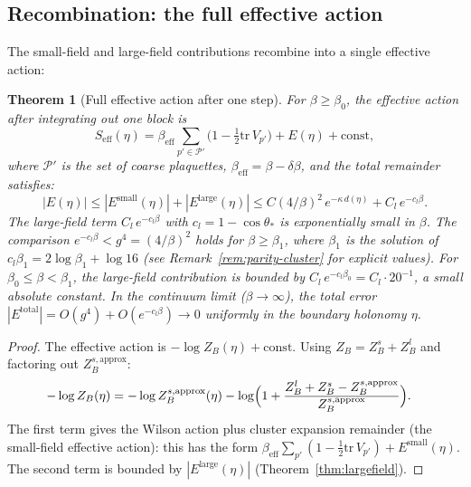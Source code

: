 \documentclass[11pt]{article}
\newtheorem{theorem}{Theorem}[section]
\theoremstyle{definition}
\newcommand{\tr}{\mathrm{tr}}
\begin{document}
\subsection{Recombination: the full effective action}
\label{subsec:recombine}

The small-field and large-field contributions recombine into a single
effective action:

\begin{theorem}[Full effective action after one step]\label{thm:fulleff}
For $\beta\ge\beta_0$, the effective action after integrating out one block
is
\begin{equation}\label{eq:Seff-full}
S_{\mathrm{eff}}(\eta)
=\beta_{\mathrm{eff}}\sum_{p'\in\mathcal{P}'}
\bigl(1-\tfrac{1}{2}\tr\,V_{p'}\bigr)
+E(\eta)+\mathrm{const},
\end{equation}
where $\mathcal{P}'$ is the set of coarse plaquettes,
$\beta_{\mathrm{eff}}=\beta-\delta\beta$, and the total remainder
satisfies:
\begin{equation}\label{eq:E-total}
|E(\eta)|\le|E^{\mathrm{small}}(\eta)|+|E^{\mathrm{large}}(\eta)|
\le C(4/\beta)^2\,e^{-\kappa\,d(\eta)}+C_l\,e^{-c_l\beta}.
\end{equation}
The large-field term $C_l\,e^{-c_l\beta}$ with
$c_l=1-\cos\theta_*$ is exponentially small in $\beta$.
The comparison $e^{-c_l\beta}<g^4=(4/\beta)^2$ holds for
$\beta\ge\beta_1$, where $\beta_1$ is the solution of
$c_l\beta_1=2\log\beta_1+\log 16$
(see Remark~\ref{rem:parity-cluster} for explicit values).
For $\beta_0\le\beta<\beta_1$,
the large-field contribution is bounded by
$C_l\,e^{-c_l\beta_0}=C_l\cdot 20^{-1}$, a small absolute constant.
In the continuum limit ($\beta\to\infty$), the total error
$|E^{\mathrm{total}}|=O(g^4)+O(e^{-c_l\beta})\to 0$
uniformly in the boundary holonomy $\eta$.
\end{theorem}

\begin{proof}
The effective action is $-\log Z_B(\eta)+\mathrm{const}$.  Using
$Z_B=Z_B^s+Z_B^l$ and factoring out $Z_B^{s,\mathrm{approx}}$:
\begin{align}
-\log Z_B(\eta)
&=-\log Z_B^{s,\mathrm{approx}}(\eta)
-\log\Bigl(1+\frac{Z_B^l+Z_B^s-Z_B^{s,\mathrm{approx}}}
{Z_B^{s,\mathrm{approx}}}\Bigr).
\end{align}
The first term gives the Wilson action plus cluster expansion remainder
(the small-field effective action): this has the form
$\beta_{\mathrm{eff}}\sum_{p'}(1-\frac{1}{2}\tr\,V_{p'})
+E^{\mathrm{small}}(\eta)$.
The second term is bounded by $|E^{\mathrm{large}}(\eta)|$
(Theorem~\ref{thm:largefield}).
\end{proof}
\end{document}
